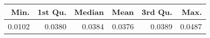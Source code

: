 \begin{table}[ht]
\centering
\begin{tabular}{rrrrrr}
  \hline
Min. & 1st Qu. & Median & Mean & 3rd Qu. & Max. \\ 
  \hline
0.0102 & 0.0380 & 0.0384 & 0.0376 & 0.0389 & 0.0487 \\ 
   \hline
\end{tabular}
\end{table}

